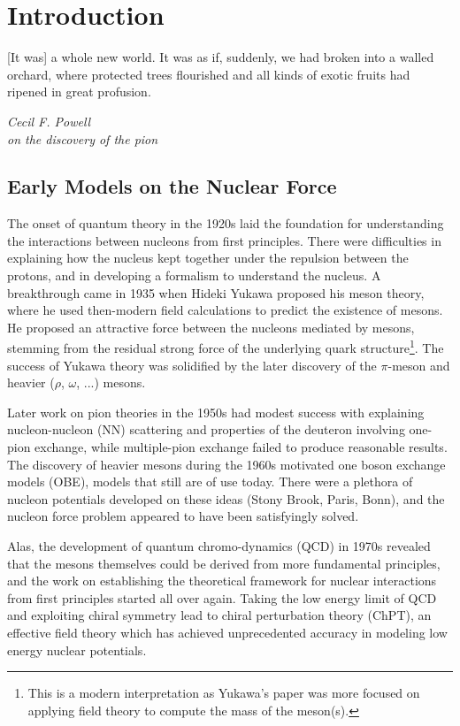 \section{Introduction}

\epigraph{[It was] a whole new world. It was as if, suddenly, we had broken into
  a walled orchard, where protected trees flourished and all kinds of exotic
  fruits had ripened in great profusion.}{\textit{Cecil F. Powell \\ on the
    discovery of the pion\cite{powell}}} 

\subsection{Early Models on the Nuclear Force}

The onset of quantum theory in the 1920s laid the foundation for
understanding the interactions between nucleons from first principles. There
were difficulties in explaining how the nucleus kept together under the
repulsion between the protons, and in developing a formalism to understand the
nucleus. A
breakthrough came in 1935 when Hideki Yukawa proposed his meson theory,
where he used then-modern field calculations to predict the
existence of mesons\cite{Yukawa}. He proposed an attractive force between the nucleons
mediated by mesons, stemming from the residual strong force of the underlying quark
structure\footnote{This is a modern interpretation as Yukawa's paper was more
  focused on applying field theory to compute the mass of the meson(s).}. 
The success of Yukawa theory was solidified by the
later discovery of the \(\pi\)-meson\cite{LATTES1947} and heavier (\(\rho\), \(\omega\),
...) mesons\cite{PhysRevLett.6.628}.

Later work on pion theories in the 1950s had modest success with explaining
nucleon-nucleon (NN) scattering and properties of the deuteron involving one-pion
exchange, while multiple-pion exchange failed to produce reasonable
results\cite[p.~4]{10.1143/PTP.16.604,MACHLEIDT19871}. The discovery of heavier mesons during the 1960s motivated
one boson exchange models (OBE), models that still are of use today. There
were a plethora of nucleon potentials developed on these ideas (Stony
Brook\cite{JACKSON1975397}, Paris\cite{PhysRevC.21.861}, Bonn\cite{MACHLEIDT19871}), and the nucleon
force problem appeared to have been satisfyingly solved.

Alas, the development of quantum chromo-dynamics (QCD) in 1970s revealed that
the mesons themselves could be derived from more fundamental principles, and the work on
establishing the theoretical framework for nuclear interactions from first principles started 
all over again. Taking the low energy limit of QCD and exploiting chiral
symmetry lead to chiral perturbation theory (ChPT), an effective field theory which has achieved unprecedented
accuracy in modeling low energy nuclear potentials.

